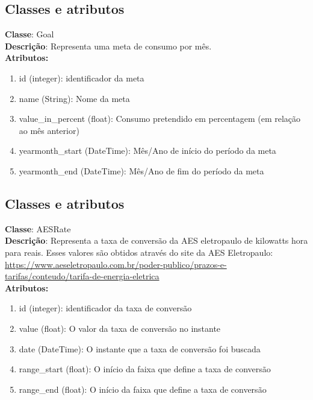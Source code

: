 \subsection{Classes e atributos}
	\textbf{Classe}: Goal\\
	\textbf{Descrição}: Representa uma meta de consumo por mês.\\
	\textbf{Atributos:}
\begin{enumerate}
	\item id (integer): identificador da meta
	\item name (String):  Nome da meta
	\item value\_in\_percent (float): Consumo pretendido em percentagem (em relação ao mês anterior)
	\item yearmonth\_start (DateTime): Mês/Ano de início do período da meta
    \item yearmonth\_end (DateTime): Mês/Ano de fim do período da meta
\end{enumerate}

\subsection{Classes e atributos}
	\textbf{Classe}: AESRate\\
	\textbf{Descrição}: Representa a taxa de conversão da AES eletropaulo de kilowatts hora para reais. Esses valores são obtidos através do site da AES Eletropaulo: \url{https://www.aeseletropaulo.com.br/poder-publico/prazos-e-tarifas/conteudo/tarifa-de-energia-eletrica}\\
	\textbf{Atributos:}
\begin{enumerate}
	\item id (integer): identificador da taxa de conversão
	\item value (float): O valor da taxa de conversão no instante
	\item date (DateTime): O instante que a taxa de conversão foi buscada
	\item range\_start (float): O início da faixa que define a taxa de conversão
    \item range\_end (float): O início da faixa que define a taxa de conversão
\end{enumerate}

